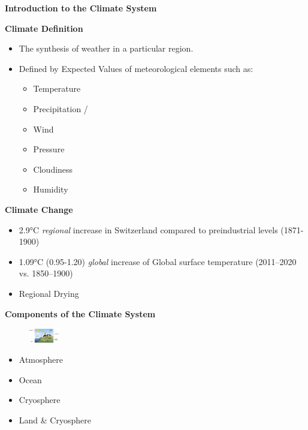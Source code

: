 \documentclass[fontsize=8pt, a4paper, landscape, fleqn]{scrartcl}
\renewcommand{\section}[1]{%
    \noindent\colorbox{sectioncolor}{%
        \parbox{\dimexpr\columnwidth-2\fboxsep}{\color{white}\textbf{#1}}}%
    \vspace{0.5mm}%
}
\renewcommand{\subsection}[1]{%
    \noindent\colorbox{subsectioncolor}{%
        \parbox{\dimexpr\columnwidth-2\fboxsep}{\color{white}\textbf{#1}}}%
    \vspace{0.5mm}%
}
\begin{document}
\begin{multicols*}{3}[\raggedcolumns]
\section{Introduction to the Climate System}
\subsection{Climate Definition}
\begin{itemize}
    \item The synthesis of weather in a particular region.
    \item Defined by Expected Values of meteorological elements such as:
    \begin{itemize}
        \item Temperature 
        \item Precipitation /
        \item Wind
        \item Pressure 
        \item Cloudiness 
        \item Humidity 
    \end{itemize}
\end{itemize}

\subsection{Climate Change}
\begin{itemize}
    \item 2.9°C \textit{regional} increase in Switzerland compared to preindustrial levels (1871-1900)
    \item 1.09°C (0.95-1.20) \textit{global} increase of Global surface temperature (2011–2020 vs. 1850–1900)
    \item Regional Drying
\end{itemize}

\subsection{Components of the Climate System}
\begin{figure}
    \centering
    \includegraphics[width=0.12\textwidth]{Secondary/img/Pasted image 20250407144258.png}
\end{figure}
\begin{itemize}
    \item Atmosphere
    \item Ocean
    \item Cryosphere
    \item Land \& Cryosphere
\end{itemize}


\end{multicols*}
\end{document}
